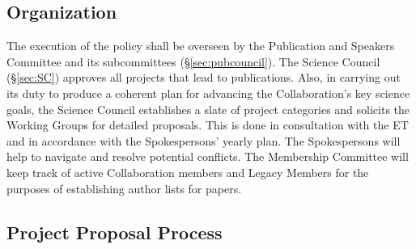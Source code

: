 \documentclass[12pt]{article}
\newcommand{\Comment}[1]{\textcolor{Blue}{(Comment: #1)}}
\begin{document}
\subsection{Organization}
The execution of the policy shall be overseen by the Publication and Speakers Committee and its subcommittees (\S\ref{sec:pubcouncil}). 
{\color{\markcolor} The Science Council (\S\ref{sec:SC}) approves all projects that lead to publications.
Also, in carrying out its duty to produce a coherent plan for advancing the Collaboration's key science goals, the Science Council establishes a slate of project categories and solicits the Working Groups for detailed proposals. %
This is done in consultation with the ET and in accordance with the Spokespersons' yearly plan.}
The Spokespersons will help to navigate and resolve potential conflicts.
The Membership Committee will keep track of active Collaboration members and Legacy Members for the purposes of establishing author lists for papers.


\subsection{Project Proposal Process}
\label{sec:pubprop}

\end{document}
